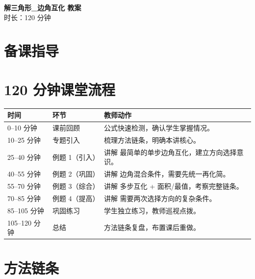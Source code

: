 \documentclass[11pt,a4paper]{ctexart}
\begin{document}
\begin{center}
  {\Large\bfseries 解三角形\_边角互化 教案}\\
  \vspace{0.5em}
  时长：120 分钟
\end{center}

\section{备课指导}



\section{120 分钟课堂流程}

\begin{tabularx}{\textwidth}{p{2.8cm}p{3.2cm}X}
\toprule
时间 & 环节 & 教师动作\\
\midrule
0--10 分钟 & 课前回顾 & 公式快速检测，确认学生掌握情况。\\ \midrule
10--25 分钟 & 专题引入 & 梳理方法链条，明确本讲核心。\\ \midrule
25--40 分钟 & 例题 1（引入）& 讲解 最简单的单步边角互化，建立方向选择意识。\\ \midrule
40--55 分钟 & 例题 2（巩固）& 讲解 边角混合条件，需要先统一再化简。\\ \midrule
55--70 分钟 & 例题 3（综合）& 讲解 多步互化 + 面积/最值，考察完整链条。\\ \midrule
70--85 分钟 & 例题 4（提高）& 讲解 需要两次选择方向的复杂条件。\\ \midrule
85--105 分钟 & 巩固练习 & 学生独立练习，教师巡视点拨。\\ \midrule
105--120 分钟 & 总结 & 方法链条复盘，布置课后重做。\\
\bottomrule
\end{tabularx}

\section{方法链条}
\end{document}

